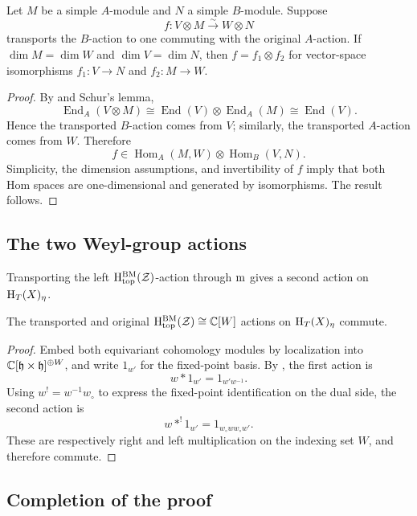 \begin{lemma}{}
  Let $M$ be a simple $A$-module and $N$ a simple $B$-module. Suppose
  \[
    f:V\otimes M\xrightarrow{\sim}W\otimes N
  \]
  transports the $B$-action to one commuting with the original
  $A$-action. If $\dim M=\dim W$ and $\dim V=\dim N$, then
  $f=f_1\otimes f_2$ for vector-space isomorphisms
  $f_1:V\to N$ and $f_2:M\to W$.
  \begin{proof}
    By  and Schur's lemma,
    \[
      \operatorname{End}_A(V\otimes M)
      \cong\operatorname{End}(V)\otimes\operatorname{End}_A(M)
      \cong\operatorname{End}(V).
    \]
    Hence the transported $B$-action comes from $V$; similarly, the
    transported $A$-action comes from $W$. Therefore
    \[
      f\in
      \operatorname{Hom}_A(M,W)\otimes\operatorname{Hom}_B(V,N).
    \]
    Simplicity, the dimension assumptions, and invertibility of $f$
    imply that both Hom spaces are one-dimensional and generated by
    isomorphisms. The result follows.
  \end{proof}
\end{lemma}

\subsection{The two Weyl-group actions}

Transporting the left $\mathrm{H}^\mathrm{BM}_\mathrm{top}(\mathcal{Z})$-action through $\mathrm{m}$
gives a second action on $\mathrm{H}_T(X)_\eta$.

\begin{proposition}{}
  The transported and original $\mathrm{H}^\mathrm{BM}_\mathrm{top}(\mathcal{Z})\cong\mathbb C[W]$
  actions on $\mathrm{H}_T(X)_\eta$ commute.
  \begin{proof}
    Embed both equivariant cohomology modules by localization into
    $\mathbb C[\mathfrak{h}\times\mathfrak{h}]^{\oplus W}$, and write $1_{w'}$ for
    the fixed-point basis. By , the first
    action is
    \[
      w*1_{w'}=1_{w'w^{-1}}.
    \]
    Using $w^!=w^{-1}w_\circ$ to express the fixed-point identification
    on the dual side, the second action is
    \[
      w*^!1_{w'}=1_{w_\circ w w_\circ w'}.
    \]
    These are respectively right and left multiplication on the
    indexing set $W$, and therefore commute.
  \end{proof}
\end{proposition}

\subsection{Completion of the proof}

